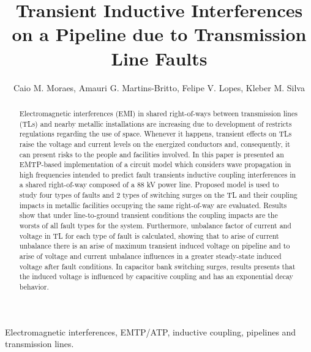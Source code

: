 \documentclass[5p,twocolumn]{elsarticle}
\begin{document}
\begin{frontmatter}

\title{Transient Inductive Interferences on a Pipeline due to Transmission Line Faults}


\author{Caio M. Moraes, Amauri G. Martins-Britto, Felipe V. Lopes, Kleber M. Silva}
\address{University of Brasília}


%
%

\begin{abstract}
Electromagnetic interferences (EMI) in shared right-of-ways between transmission lines (TLs) and nearby metallic installations are increasing due to development of restricts regulations regarding the use of space. Whenever it happens, transient effects on TLs raise the voltage and current levels on the energized conductors and, consequently, it can present risks to the people and facilities involved. In this paper is presented an EMTP-based implementation of a circuit model which considers wave propagation in high frequencies intended to predict fault transients inductive coupling interferences in a shared right-of-way composed of a 88 kV power line. Proposed model is used to study four types of faults and 2 types of switching surges on the TL and their coupling impacts in metallic facilities occupying the same right-of-way are evaluated. Results show that under line-to-ground transient conditions the coupling impacts are the worsts of all fault types for the system. Furthermore, unbalance factor of current and voltage in TL for each type of fault is calculated, showing that to arise of current unbalance there is an arise of maximum transient induced voltage on pipeline and to arise of voltage and current unbalance influences in a greater steady-state induced voltage after fault conditions. In capacitor bank switching surges, results presents that the induced voltage is influenced by capacitive coupling and has an exponential decay behavior.   
\end{abstract}

\begin{keyword}
Electromagnetic interferences, EMTP/ATP, inductive coupling, pipelines and transmission lines.
\end{keyword}

\end{frontmatter}
\end{document}
